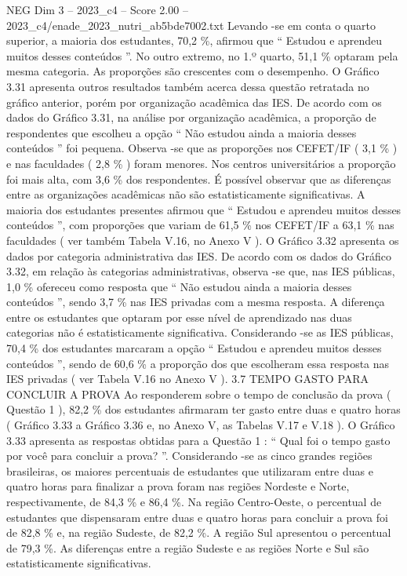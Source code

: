 \begin{textsample}{NEG Dim 3 – 2023\_c4 – Score 2.00 – 2023\_c4/enade\_2023\_nutri\_ab5bde7002.txt}
Levando -se em conta o quarto superior, a maioria dos estudantes, 70,2 \%, afirmou que “ Estudou e aprendeu muitos desses conteúdos ”.
No outro extremo, no 1.º quarto, 51,1 \% optaram pela mesma categoria.
As proporções são crescentes com o desempenho.
O Gráfico 3.31 apresenta outros resultados também acerca dessa questão retratada no gráfico anterior, porém por organização acadêmica das IES.
De acordo com os dados do Gráfico 3.31, na análise por organização acadêmica, a proporção de respondentes que escolheu a opção “ Não estudou ainda a maioria desses conteúdos ” foi pequena.
Observa -se que as proporções nos CEFET/IF ( 3,1 \% ) e nas faculdades ( 2,8 \% ) foram menores.
Nos centros universitários a proporção foi mais alta, com 3,6 \% dos respondentes.
É possível observar que as diferenças entre as organizações acadêmicas não são estatisticamente significativas.
A maioria dos estudantes presentes afirmou que “ Estudou e aprendeu muitos desses conteúdos ”, com proporções que variam de 61,5 \% nos CEFET/IF a 63,1 \% nas faculdades ( ver também Tabela V.16, no Anexo V ).
O Gráfico 3.32 apresenta os dados por categoria administrativa das IES.
De acordo com os dados do Gráfico 3.32, em relação às categorias administrativas, observa -se que, nas IES públicas, 1,0 \% ofereceu como resposta que “ Não estudou ainda a maioria desses conteúdos ”, sendo 3,7 \% nas IES privadas com a mesma resposta.
A diferença entre os estudantes que optaram por esse nível de aprendizado nas duas categorias não é estatisticamente significativa.
Considerando -se as IES públicas, 70,4 \% dos estudantes marcaram a opção “ Estudou e aprendeu muitos desses conteúdos ”, sendo de 60,6 \% a proporção dos que escolheram essa resposta nas IES privadas ( ver Tabela V.16 no Anexo V ). 3.7 TEMPO GASTO PARA CONCLUIR A PROVA Ao responderem sobre o tempo de conclusão da prova ( Questão 1 ), 82,2 \% dos estudantes afirmaram ter gasto entre duas e quatro horas ( Gráfico 3.33 a Gráfico 3.36 e, no Anexo V, as Tabelas V.17 e V.18 ).
O Gráfico 3.33 apresenta as respostas obtidas para a Questão 1 : “ Qual foi o tempo gasto por você para concluir a prova? ”.
Considerando -se as cinco grandes regiões brasileiras, os maiores percentuais de estudantes que utilizaram entre duas e quatro horas para finalizar a prova foram nas regiões Nordeste e Norte, respectivamente, de 84,3 \% e 86,4 \%.
Na região Centro-Oeste, o percentual de estudantes que dispensaram entre duas e quatro horas para concluir a prova foi de 82,8 \% e, na região Sudeste, de 82,2 \%.
A região Sul apresentou o percentual de 79,3 \%.
As diferenças entre a região Sudeste e as regiões Norte e Sul são estatisticamente significativas.

\end{textsample}
